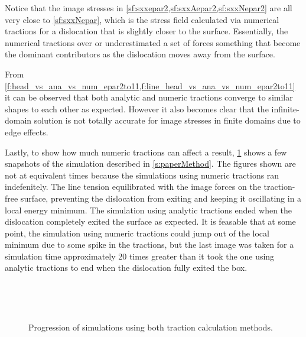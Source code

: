 Notice that the image stresses in \cref{sf:sxxepar2,sf:sxxAepar2,sf:sxxNepar2} are all very close to \cref{sf:sxxNepar}, which is the stress field calculated via numerical tractions for a dislocation that is slightly closer to the surface. Essentially, the numerical tractions over or underestimated a set of forces something that become the dominant contributors as the dislocation moves away from the surface.

From \cref{f:head_vs_ana_vs_num_epar2to11,f:line_head_vs_ana_vs_num_epar2to11} it can be observed that both analytic and numeric tractions converge to similar shapes to each other as expected. However it also becomes clear that the infinite-domain solution is not totally accurate for image stresses in finite domains due to edge effects.

Lastly, to show how much numeric tractions can affect a result, \cref{f:simulation} shows a few snapshots of the simulation described in \cref{s:paperMethod}. The figures shown are not at equivalent times because the simulations using numeric tractions ran indefenitely. The line tension equilibrated with the image forces on the traction-free surface, preventing the dislocation from exiting and keeping it oscillating in a local energy minimum. The simulation using analytic tractions ended when the dislocation completely exited the surface as expected. It is feasable that at some point, the simulation using numeric tractions could jump out of the local minimum due to some spike in the tractions, but the last image was taken for a simulation time approximately 20 times greater than it took the one using analytic tractions to end when the dislocation fully exited the box.
\begin{figure}
    ~
    ~

    ~
    ~
    \caption[Unloaded simulations using analytic and numeric tractions.]{Progression of simulations using both traction calculation methods.}
    \label{f:simulation}
\end{figure}

